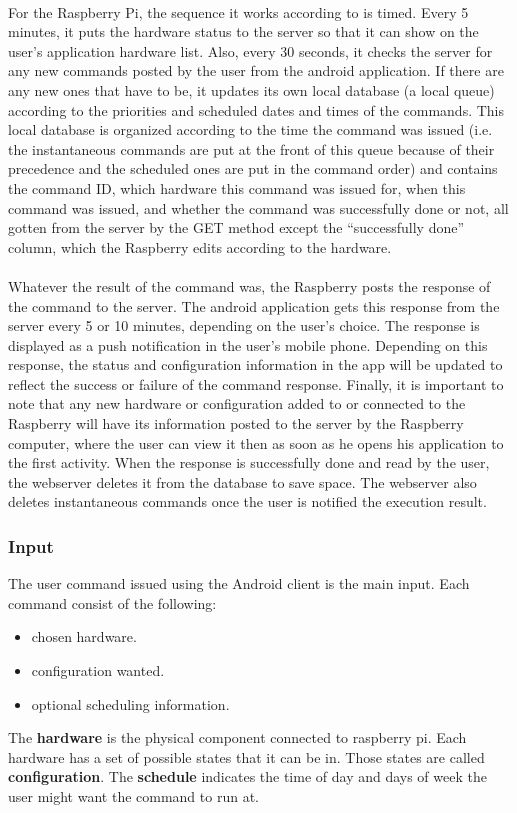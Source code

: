 \documentclass[12pt, oneside, a4paper]{book}
\begin{document}
				\paragraph{}For the Raspberry Pi, the sequence it works according to is timed. Every 5 minutes, it puts the hardware status to the server so that it can show on the user’s application hardware list. Also, every 30 seconds, it checks the server for any new commands posted by the user from the android application. If there are any new ones that have to be, it updates its own local database (a local queue) according to the priorities and scheduled dates and times of the commands. This local database is organized according to the time the command was issued (i.e. the instantaneous commands are put at the front of this queue because of their precedence and the scheduled ones are put in the command order) and contains the command ID, which hardware this command was issued for, when this command was issued, and whether the command was successfully done or not, all gotten from the server by the GET method except the “successfully done” column, which the Raspberry edits according to the hardware. 
				\paragraph{}Whatever the result of the command was, the Raspberry posts the response of the command to the server. The android application gets this response from the server every 5 or 10 minutes, depending on the user’s choice. The response is displayed as a push notification in the user’s mobile phone. Depending on this response, the status and configuration information in the app will be updated to reflect the success or failure of the command response. Finally, it is important to note that any new hardware or configuration added to or connected to the Raspberry will have its information posted to the server by the Raspberry computer, where the user can view it then as soon as he opens his application to the first activity. When the response is successfully done and read by the user, the webserver deletes it from the database to save space. The webserver also deletes instantaneous commands once the user is notified the execution result. 
				\subsubsection{Input}
				The user command issued using the Android client is the main input. Each command consist of the following:
				\begin{itemize}
					\item chosen hardware.
					\item configuration wanted.
					\item optional scheduling information.
				\end{itemize}
				The \textbf{hardware} is the physical component connected to raspberry pi. Each hardware has a set of possible states that it can be in. Those states are called \textbf{configuration}. The \textbf{schedule} indicates the time of day and days of week the user might want the command to run at.
\end{document}
